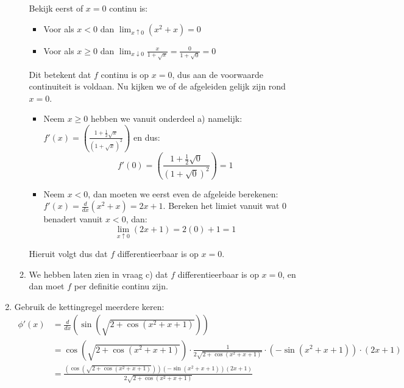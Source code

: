 \documentclass{article}
\newcommand{\f}[2]{\frac{#1}{#2}}
\newcommand{\s}[1]{\sqrt{#1}}
\renewcommand{\l}{\left}
\renewcommand{\r}{\right}
\begin{document}
\begin{enumerate}[label=\arabic*)]
\begin{enumerate}[label=\alph*)]
                    Bekijk eerst of $x=0$ continu is:
                    \begin{itemize}
                        \item Voor als $x < 0$ dan $\lim_{x \uparrow 0} (x^2 + x) = \boxed{0}$
                        \item Voor als $x \geq 0$ dan $\lim_{x \downarrow 0} {\f{x}{1+\s{x}}} = \f{0}{1 + \s{0}}=\boxed{0}$
                    \end{itemize}
                    Dit betekent dat $f$ continu is op $x=0$, dus aan de voorwaarde continuiteit is voldaan.
                    Nu kijken we of de afgeleiden gelijk zijn rond $x=0$.
                    \begin{itemize}
                        \item Neem $x \geq 0$ hebben we vanuit onderdeel a) namelijk:
                              $f'(x) = \l(\f{1+\f{1}{2}\s{x}}{(1+\s{x})^2}\r)$
                              en dus: \[f'(0)= \l(\f{1+\f{1}{2}\s{0}}{(1+\s{0})^2}\r) =
                                  \boxed{1}\]
                        \item Neem $x < 0 $, dan moeten we eerst even de afgeleide berekenen:
                              $f'(x) = \f{d}{dx}(x^2 + x) = 2x + 1$.
                              Bereken het limiet vanuit wat $0$ benadert vanuit $x < 0$, dan:
                              \[\lim_{x \uparrow 0}(2x + 1) = 2(0) + 1 = \boxed{1}\]
                    \end{itemize}
                    Hieruit volgt dus dat $f$ differentieerbaar is op $x = 0$.
              \item We hebben laten zien in vraag c) dat $f$ differentieerbaar is op $x=0$, en dan moet $f$ per definitie continu zijn.
          \end{enumerate}
    \item Gebruik de kettingregel meerdere keren:
          \begin{align*}
              \phi'(x) & = \f{d}{dx}\l(\sin\l(\sqrt{2 + \cos(x^2 + x + 1)}\r)\r)                                               \\
                       & = \cos\l(\s{2 + \cos(x^2 + x + 1)}\r) \cdot \f{1}{2\s{2 + \cos(x^2 + x + 1)}}
              \cdot \l(-\sin(x^2 + x + 1)\r) \cdot (2x + 1)                                                                    \\
                       & = \boxed{\f{(\cos(\s{2 + \cos(x^2 + x + 1)}))(-\sin(x^2 + x + 1))(2x+1)}{2\s{2 + \cos(x^2 + x + 1)}}}

\end{align*}
\end{enumerate}
\end{document}
